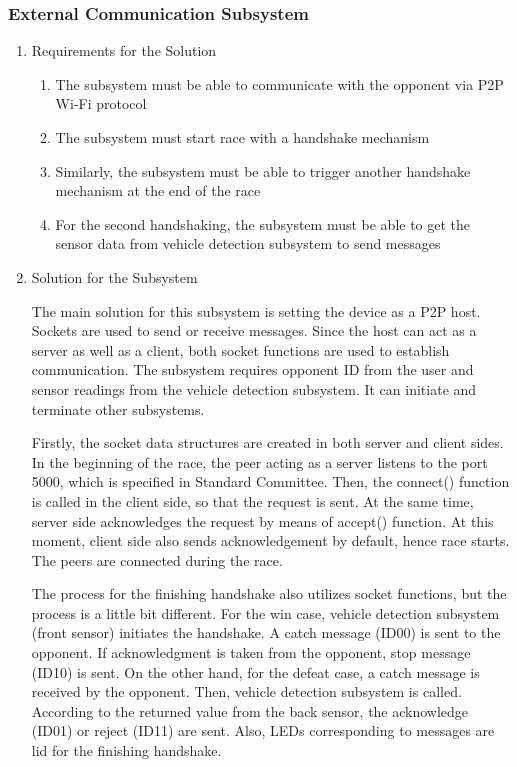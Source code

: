 \documentclass[a4paper,12pt]{article}
\begin{document}
\subsubsection{External Communication Subsystem}	


\begin{enumerate}

\item {Requirements for the Solution}

\begin{enumerate}

\item The subsystem must be able to communicate with the opponent via P2P Wi-Fi protocol

\item The subsystem must start race with a handshake mechanism

\item Similarly, the subsystem must be able to trigger another handshake mechanism at the end of the race

\item For the second handshaking, the subsystem must be able to get the sensor data from vehicle detection subsystem to send messages

\end{enumerate}

\item {Solution for the Subsystem}


The main solution for this subsystem is setting the device as a P2P host. Sockets are used to send or receive messages.  Since the host can act as a server as well as a client, both socket functions are used to establish communication. The subsystem requires opponent ID from the user and sensor readings from the vehicle detection subsystem. It can initiate and terminate other subsystems.


Firstly, the socket data structures are created in both server and client sides. In the beginning of the race, the peer acting as a server listens to the port 5000, which is specified in Standard Committee. Then, the connect() function is called in the client side, so that the request is sent. At the same time, server side acknowledges the request by means of accept() function. At this moment, client side also sends acknowledgement by default, hence race starts. The peers are connected during the race.


The process for the finishing handshake also utilizes socket functions, but the process is a little bit different. For the win case, vehicle detection subsystem (front sensor) initiates the handshake. A catch message (ID00) is sent to the opponent. If acknowledgment is taken from the opponent, stop message (ID10) is sent. On the other hand, for the defeat case, a catch message is received by the opponent. Then, vehicle detection subsystem is called. According to the returned value from the back sensor, the acknowledge (ID01) or reject (ID11) are sent. Also, LEDs corresponding to messages are lid for the finishing handshake.




\end{enumerate}
\end{document}
